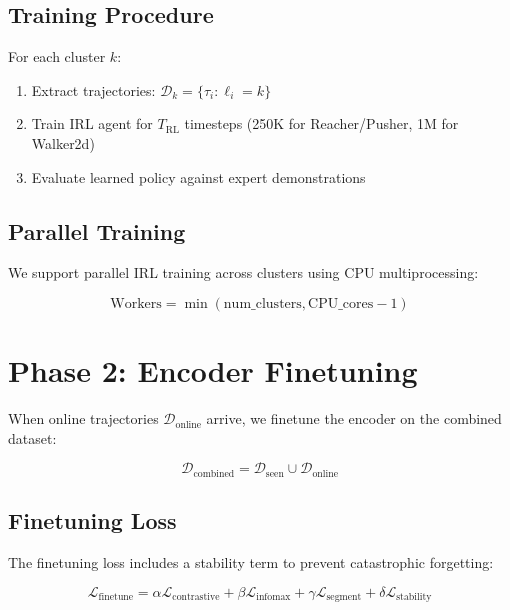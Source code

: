 \documentclass{article}
\begin{document}
\subsection{Training Procedure}

For each cluster $k$:
\begin{enumerate}
    \item Extract trajectories: $\mathcal{D}_k = \{\tau_i : \ell_i = k\}$
    \item Train IRL agent for $T_{\text{RL}}$ timesteps (250K for Reacher/Pusher, 1M for Walker2d)
    \item Evaluate learned policy against expert demonstrations
\end{enumerate}

\subsection{Parallel Training}

We support parallel IRL training across clusters using CPU multiprocessing:

\begin{equation}
    \text{Workers} = \min(\text{num\_clusters}, \text{CPU\_cores} - 1)
\end{equation}

\section{Phase 2: Encoder Finetuning}

When online trajectories $\mathcal{D}_{\text{online}}$ arrive, we finetune the encoder on the combined dataset:

\begin{equation}
    \mathcal{D}_{\text{combined}} = \mathcal{D}_{\text{seen}} \cup \mathcal{D}_{\text{online}}
\end{equation}

\subsection{Finetuning Loss}

The finetuning loss includes a stability term to prevent catastrophic forgetting:

\begin{equation}
    \mathcal{L}_{\text{finetune}} = \alpha \mathcal{L}_{\text{contrastive}} + \beta \mathcal{L}_{\text{infomax}} + \gamma \mathcal{L}_{\text{segment}} + \delta \mathcal{L}_{\text{stability}}
\end{equation}
\end{document}
